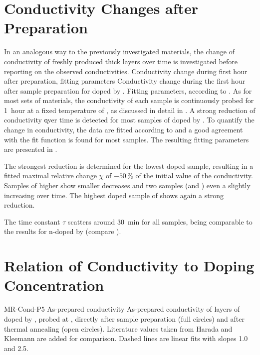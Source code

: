\section{Conductivity Changes after Preparation}%
\label{sec:ResP5-LongTimeCond}
In an analogous way to the previously investigated materials, the change of conductivity of freshly produced  thick layers over time is investigated before reporting on the observed conductivities.
%
{Conductivity change during first hour after preparation, fitting parameters}
{Conductivity change during the first hour after sample preparation for \pen doped by \FV. Fitting parameters, according to .
}
%
As for most sets of materials, the conductivity of each sample is continuously probed \insitu for 1~hour at a fixed temperature of \T[25], as discussed in detail in . A strong reduction of conductivity \c over time is detected for most samples of \pen doped by \FV. To quantify the change in conductivity, the data are fitted according to  and a good agreement with the fit function is found for most samples. The resulting fitting parameters are presented in .

The strongest reduction is determined for the lowest doped sample, resulting in a fitted maximal relative change $\chi$ of $-50\,\%$ of the initial value of the conductivity. Samples of higher \CLongs show smaller decreases and two samples (\C[0.043] and ) even a slightly increasing \cLong over time. The highest doped sample of \C[0.193] shows again a strong reduction.

The time constant $\tau$ scatters around \SI{30}{\minute} for all samples, being comparable to the results for \CS n-doped by \dmbi (compare ).

\section{Relation of Conductivity to Doping Concentration}%
\label{sec:ResP5-CondMR}
%
\cBild
{MR-Cond-P5}
{As-prepared conductivity}
{As-prepared conductivity \vs \CLong of layers of \pen doped by \FV, probed at \T[25], directly after sample preparation (full circles) and after thermal annealing (open circles). Literature values taken from Harada\etal\cite{Harada2010} and Kleemann\etal\cite{Kleemann2012a} are added for comparison.
Dashed lines are linear fits with slopes 1.0 and 2.5.
}

